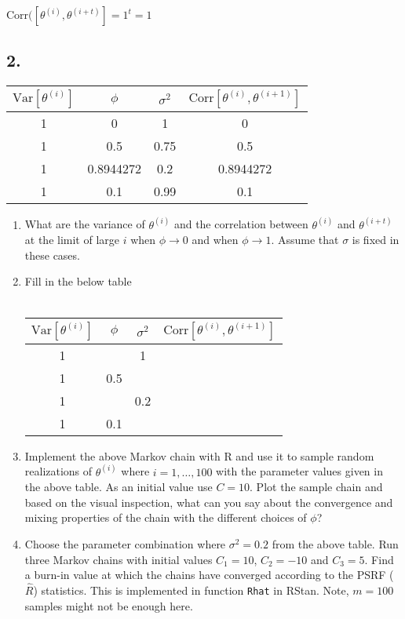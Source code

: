 \documentclass[
]{article}
\begin{document}
\(\text{Corr}([\theta^{(i)},\theta^{(i+t)}] = 1^t = 1\)

\hypertarget{section-1}{%
\subsection{2.}\label{section-1}}

\begin{enumerate}
\begin{tabular}{c|c|c|c}
$\text{Var}[\theta^{(i)}]$ & $\phi$ & $\sigma^2$ & $\text{Corr}[\theta^{(i)},\theta^{(i+1)}]$\\
\hline
1 & 0 & 1 & 0\\ 
1 & 0.5 & 0.75 & 0.5\\
1 & 0.8944272 & 0.2 & 0.8944272\\
1 & 0.1 & 0.99 & 0.1\\
\end{tabular}
\end{enumerate}

\begin{enumerate}
\item What are the variance of $\theta^{(i)}$ and the correlation between $\theta^{(i)}$ and $\theta^{(i+t)}$ at the limit of large $i$ when $\phi \rightarrow 0$ and when $\phi \rightarrow 1$. Assume that $\sigma$ is fixed in these cases.
\item Fill in the below table\\ \\
\begin{tabular}{c|c|c|c}
$\text{Var}[\theta^{(i)}]$ & $\phi$ & $\sigma^2$ & $\text{Corr}[\theta^{(i)},\theta^{(i+1)}]$\\
\hline
1 &     &  1   &  \\ 
1 & 0.5 &      &   \\
1 &     &  0.2 & \\
1 & 0.1 &   & \\
\end{tabular}
\item Implement the above Markov chain with R and use it to sample random realizations of $\theta^{(i)}$ where $i=1,\dots,100$ with the parameter values given in the above table. As an initial value use $C=10$. Plot the sample chain and based on the visual inspection, what can you say about the convergence and mixing properties of the chain with the different choices of $\phi$?
\item Choose the parameter combination where $\sigma^2=0.2$ from the above table. Run three Markov chains with initial values $C_1 = 10$, $C_2=-10$ and $C_3=5$. Find a burn-in value at which the chains have converged according to the PSRF ($\hat{R}$) statistics. This is implemented in function \texttt{Rhat} in RStan. Note, $m=100$ samples might not be enough here.
\end{enumerate}
\end{document}
